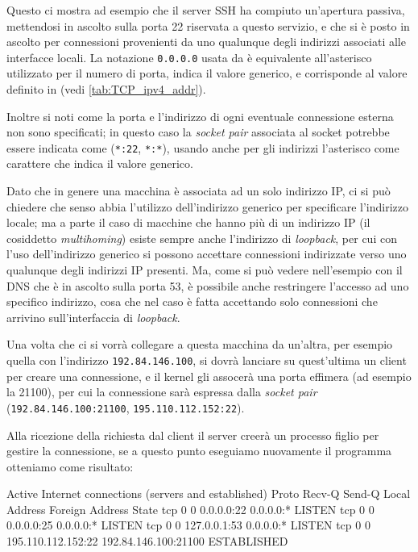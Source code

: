 Questo ci mostra ad esempio che il server SSH ha compiuto un'apertura passiva,
mettendosi in ascolto sulla porta 22 riservata a questo servizio, e che si è
posto in ascolto per connessioni provenienti da uno qualunque degli indirizzi
associati alle interfacce locali. La notazione \texttt{0.0.0.0} usata da
 è equivalente all'asterisco utilizzato per il numero di porta,
indica il valore generico, e corrisponde al valore 
definito in  (vedi \ref{tab:TCP_ipv4_addr}).

Inoltre si noti come la porta e l'indirizzo di ogni eventuale connessione
esterna non sono specificati; in questo caso la \textit{socket pair} associata
al socket potrebbe essere indicata come (\texttt{*:22}, \texttt{*:*}), usando
anche per gli indirizzi l'asterisco come carattere che indica il valore
generico.

Dato che in genere una macchina è associata ad un solo indirizzo IP, ci si può
chiedere che senso abbia l'utilizzo dell'indirizzo generico per specificare
l'indirizzo locale; ma a parte il caso di macchine che hanno più di un
indirizzo IP (il cosiddetto \textit{multihoming}) esiste sempre anche
l'indirizzo di \textit{loopback}, per cui con l'uso dell'indirizzo generico si
possono accettare connessioni indirizzate verso uno qualunque degli indirizzi
IP presenti. Ma, come si può vedere nell'esempio con il DNS che è in ascolto
sulla porta 53, è possibile anche restringere l'accesso ad uno specifico
indirizzo, cosa che nel caso è fatta accettando solo connessioni che arrivino
sull'interfaccia di \textit{loopback}.

Una volta che ci si vorrà collegare a questa macchina da un'altra, per esempio
quella con l'indirizzo \texttt{192.84.146.100}, si dovrà lanciare su
quest'ultima un client  per creare una connessione, e il kernel gli
assocerà una porta effimera (ad esempio la 21100), per cui la connessione sarà
espressa dalla \textit{socket pair} (\texttt{192.84.146.100:21100},
\texttt{195.110.112.152:22}).

Alla ricezione della richiesta dal client il server creerà un processo figlio
per gestire la connessione, se a questo punto eseguiamo nuovamente il
programma  otteniamo come risultato:
\begin{Terminal}
Active Internet connections (servers and established)
Proto Recv-Q Send-Q Local Address           Foreign Address         State      
tcp        0      0 0.0.0.0:22              0.0.0.0:*               LISTEN
tcp        0      0 0.0.0.0:25              0.0.0.0:*               LISTEN
tcp        0      0 127.0.0.1:53            0.0.0.0:*               LISTEN
tcp        0      0 195.110.112.152:22      192.84.146.100:21100    ESTABLISHED
\end{Terminal}

